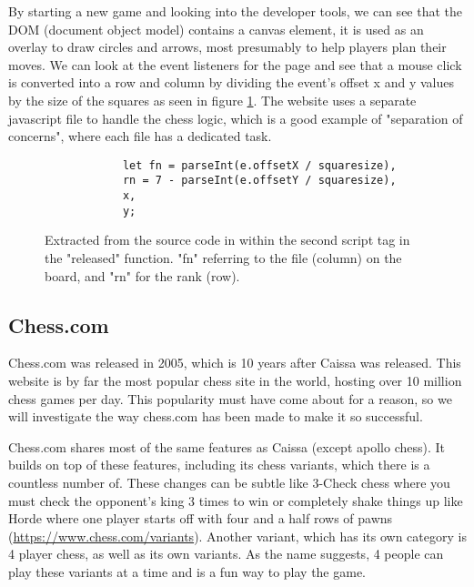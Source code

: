 By starting a new game and looking into the developer tools, we can see that the DOM (document object model) contains a canvas element, it is used as an overlay to draw circles and arrows, most presumably to help players plan their moves. We can look at the event listeners for the page and see that a mouse click is converted into a row and column by dividing the event's offset x and y values by the size of the squares as seen in figure \ref{CaissaMouseToSquare}. The website uses a separate javascript file to handle the chess logic, which is a good example of "separation of concerns", where each file has a dedicated task.

\begin{figure}[h]
    \begin{center}
        \begin{lstlisting}
            let fn = parseInt(e.offsetX / squaresize),
            rn = 7 - parseInt(e.offsetY / squaresize),
            x,
            y;
        \end{lstlisting}
        \caption{Extracted from the source code in \cite{CaissaCode} within the second script tag in the "released" function. "fn" referring to the file (column) on the board, and "rn" for the rank (row).}
        \label{CaissaMouseToSquare}
    \end{center}
\end{figure}

\subsection{Chess.com}

\cite{Chess.com} Chess.com was released in 2005, which is 10 years after Caissa was released. This website is by far the most popular chess site in the world, hosting over 10 million chess games per day. This popularity must have come about for a reason, so we will investigate the way chess.com has been made to make it so successful.

Chess.com shares most of the same features as Caissa (except apollo chess). It builds on top of these features, including its chess variants, which there is a countless number of. These changes can be subtle like 3-Check chess where you must check the opponent's king 3 times to win or completely shake things up like Horde where one player starts off with four and a half rows of pawns (\url{https://www.chess.com/variants}). Another variant, which has its own category is 4 player chess, as well as its own variants. As the name suggests, 4 people can play these variants at a time and is a fun way to play the game.

